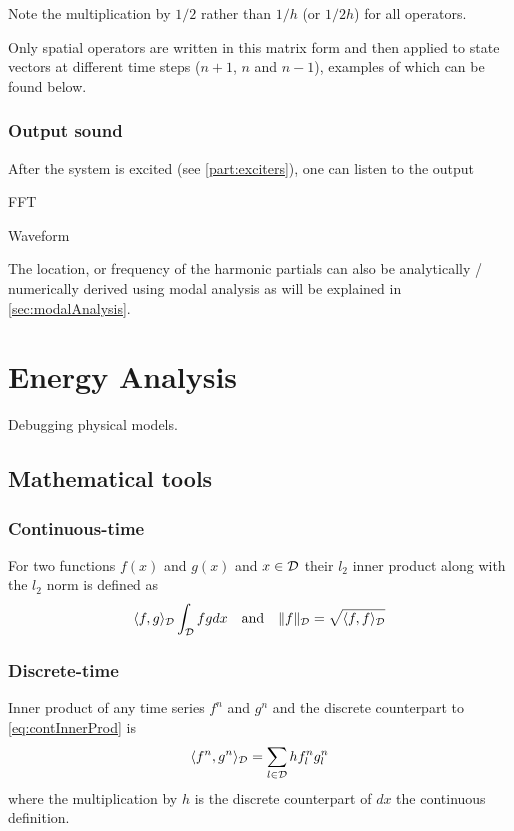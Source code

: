 Note the multiplication by $1/2$ rather than $1/h$ (or $1/2h$) for all operators.


Only spatial operators are written in this matrix form and then applied to state vectors at different time steps ($n+1$, $n$ and $n-1$), examples of which can be found below.

\subsubsection{Output sound}
After the system is excited (see \ref{part:exciters}), one can listen to the output

FFT

Waveform

The location, or frequency  of the harmonic partials can also be analytically / numerically derived using modal analysis as will be explained in \ref{sec:modalAnalysis}.

\section{Energy Analysis}\label{sec:energyAnalysis}
Debugging physical models.

\subsection{Mathematical tools}
\subsubsection{Continuous-time}
For two functions $f(x)$ and $g(x)$ and $x\in\mathcal{D}$ their $l_2$ inner product along with the $l_2$ norm is defined as
\begin{equation}\label{eq:contInnerProd}
    \langle f, g\rangle_{\mathcal{D}} \int_{\mathcal{D}} fg dx \quad \text{and} \quad \lVert f \rVert_{\mathcal{D}} = \sqrt{\langle f, f \rangle_{\mathcal{D}}}
\end{equation}


\subsubsection{Discrete-time}
Inner product of any time series $f^n$ and $g^n$ and the discrete counterpart to \eqref{eq:contInnerProd} is
\begin{equation}\label{eq:discInnerProd}
    \langle f^n, g^n \rangle_{\mathcal{D}} = \sum_{l\in\mathcal{D}} h f_l^n g_l^n
\end{equation}
where the multiplication by $h$ is the discrete counterpart of $dx$ the continuous definition. 

